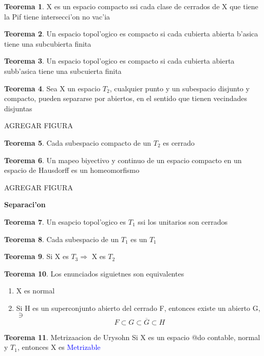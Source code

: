 \documentclass{article}
\theoremstyle{definition}
\newtheorem{theorem}{Teorema}
\begin{document}
\begin{theorem}
	X es un espacio compacto ssi cada clase de cerrados de X que tiene la Pif tiene intersecci'on no vac'ia
\end{theorem}
\begin{theorem}
	Un espacio topol'ogico es compacto si cada cubierta abierta b'asica tiene una subcubierta finita
\end{theorem}
\begin{theorem}
	Un espacio topol'ogico es compacto si cada cubierta abierta subb'asica tiene una subcuierta finita
\end{theorem}
\begin{theorem}
	Sea X un espacio $T_2$, cualquier punto y un subespacio disjunto y compacto, pueden separarse por abiertos, en el sentido que tienen vecindades disjuntas
	
	AGREGAR FIGURA
\end{theorem}
\begin{theorem}
	Cada subespacio compacto de un $T_2$ es cerrado
\end{theorem}
\begin{theorem}
	Un mapeo biyectivo y continuo de un espacio compacto en un espacio de Hausdorff es un homeomorfismo
	
	AGREGAR FIGURA
\end{theorem}
\textbf{Separaci'on}
\begin{theorem}
	Un esapcio topol'ogico es $T_1$ ssi los unitarios son cerrados
\end{theorem}
\begin{theorem}
	Cada subespacio de un $T_1$ es un $T_1$
\end{theorem}
\begin{theorem}
	Si X es $T_3\Rightarrow$ X es $T_2$
\end{theorem}
\begin{theorem}
	Los enunciados siguietnes son equivalentes
	\begin{enumerate}
		\item X es normal
		\item Si H es un superconjunto abierto del cerrado F, entonces existe un abierto G, $\ni$
		\[F\subset G\subset \overline{G}\subset H\]
	\end{enumerate}
\end{theorem}
\begin{theorem}{Metrizaacion de Urysohn}
	Si X es un espacio @do contable, normal y $T_1$, entonces X es \textcolor{blue}{Metrizable}
\end{theorem}
\end{document}
